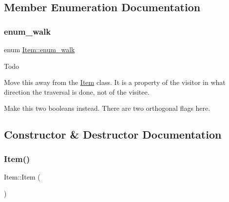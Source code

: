 \subsection{Member Enumeration Documentation}
\mbox{\label{classItem_a4e68f315ba2a26543339e9f0efed3695}} 
\subsubsection{\texorpdfstring{enum\+\_\+walk}{enum\_walk}}
{\footnotesize\ttfamily enum \mbox{\hyperlink{classItem_a4e68f315ba2a26543339e9f0efed3695}{Item\+::enum\+\_\+walk}}}

\begin{DoxyRefDesc}{Todo}
\item[\mbox{\hyperlink{todo__todo000030}{Todo}}]
\begin{DoxyEnumerate}
\item Move this away from the \mbox{\hyperlink{classItem}{Item}} class. It is a property of the visitor in what direction the traversal is done, not of the visitee.
\end{DoxyEnumerate}\end{DoxyRefDesc}



\begin{DoxyEnumerate}
\item Make this two booleans instead. There are two orthogonal flags here. 
\end{DoxyEnumerate}

\subsection{Constructor \& Destructor Documentation}
\mbox{\label{classItem_a9382072b90618574708c944b4f797eb3}} 
\subsubsection{\texorpdfstring{Item()}{Item()}\hspace{0.1cm}{\footnotesize\ttfamily [1/2]}}
{\footnotesize\ttfamily Item\+::\+Item (\begin{DoxyParamCaption}\item[{const \mbox{\hyperlink{structYYLTYPE}{P\+OS}} \&}]{ }\end{DoxyParamCaption})\hspace{0.3cm}{\ttfamily [explicit]}}

